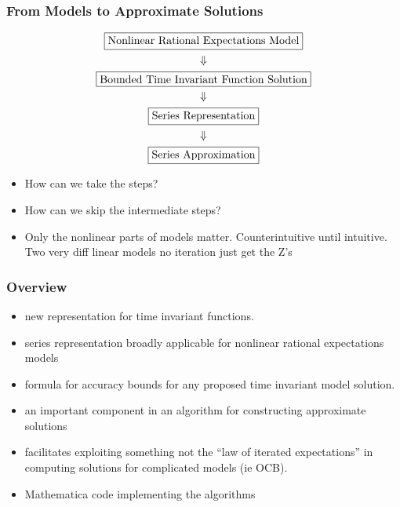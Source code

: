 \documentclass[letter]{beamer}
\begin{document}
\begin{frame}
\frametitle{From Models to Approximate Solutions }
  \begin{gather}
    \fbox{Nonlinear Rational Expectations Model}\\ \Downarrow\\
\fbox{Bounded Time Invariant Function Solution}\\\Downarrow\\
\fbox{Series Representation}\\\Downarrow\\
\fbox{Series Approximation}
  \end{gather}
  \begin{itemize}
  \item  How can we take the  steps?
  \item  How can we skip the intermediate steps?
  \item Only the nonlinear parts of models matter.  Counterintuitive until intuitive.  Two very diff linear models no iteration just get the Z's
  \end{itemize}

\end{frame}




\begin{frame}
  \frametitle{Overview}
  \begin{itemize}
  \item  new representation for time invariant functions.
  \item  series representation broadly applicable for nonlinear rational expectations models 
\item  formula for accuracy bounds for any 
proposed time invariant model solution.
\item an important component in an algorithm for constructing approximate solutions 
\item facilitates exploiting something not the ``law of iterated expectations'' in computing solutions for complicated models (ie OCB).
\item Mathematica code implementing the algorithms
  \end{itemize}
\end{frame}
\end{document}
